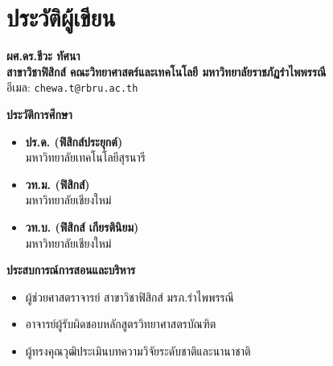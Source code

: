 \chapter*{ประวัติผู้เขียน}

\vspace{0.4cm}
\begin{center}
    {\Large\bfseries ผศ.ดร.ชีวะ ทัศนา}\\[4pt]
    {\normalsize\bfseries สาขาวิชาฟิสิกส์ คณะวิทยาศาสตร์และเทคโนโลยี มหาวิทยาลัยราชภัฏรำไพพรรณี}\\[2pt]
    {\small อีเมล: \texttt{chewa.t@rbru.ac.th}}
\end{center}

\vspace{0.6cm}
\noindent
\begin{minipage}[t]{0.48\textwidth}
    \textbf{\large ประวัติการศึกษา}
    \begin{itemize}[leftmargin=1.2cm, itemsep=4pt]
        \item \textbf{ปร.ด. (ฟิสิกส์ประยุกต์)}\\
        มหาวิทยาลัยเทคโนโลยีสุรนารี
        \item \textbf{วท.ม. (ฟิสิกส์)}\\
        มหาวิทยาลัยเชียงใหม่
        \item \textbf{วท.บ. (ฟิสิกส์ เกียรตินิยม)}\\
        มหาวิทยาลัยเชียงใหม่
    \end{itemize}

    \vspace{0.4cm}
    \textbf{\large ประสบการณ์การสอนและบริหาร}
    \begin{itemize}[leftmargin=1.2cm, itemsep=4pt]
        \item ผู้ช่วยศาสตราจารย์ สาขาวิชาฟิสิกส์ มรภ.รำไพพรรณี
        \item อาจารย์ผู้รับผิดชอบหลักสูตรวิทยาศาสตรบัณฑิต
        \item ผู้ทรงคุณวุฒิประเมินบทความวิจัยระดับชาติและนานาชาติ
    \end{itemize}
\end{minipage}
\hfill
